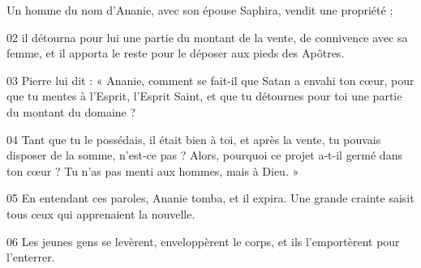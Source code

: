 Un homme du nom d’Ananie, avec son épouse Saphira, vendit une propriété ;

02 il détourna pour lui une partie du montant de la vente, de connivence avec sa femme, et il apporta le reste pour le déposer aux pieds des Apôtres.

03 Pierre lui dit : « Ananie, comment se fait-il que Satan a envahi ton cœur, pour que tu mentes à l’Esprit, l’Esprit Saint, et que tu détournes pour toi une partie du montant du domaine ?

04 Tant que tu le possédais, il était bien à toi, et après la vente, tu pouvais disposer de la somme, n’est-ce pas ? Alors, pourquoi ce projet a-t-il germé dans ton cœur ? Tu n’as pas menti aux hommes, mais à Dieu. »

05 En entendant ces paroles, Ananie tomba, et il expira. Une grande crainte saisit tous ceux qui apprenaient la nouvelle.

06 Les jeunes gens se levèrent, enveloppèrent le corps, et ils l’emportèrent pour l’enterrer.